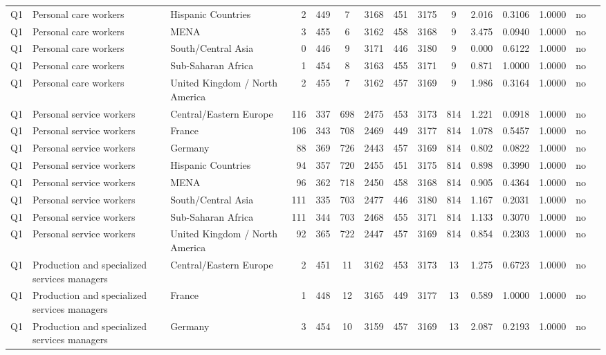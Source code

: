 \begin{longtable}{lllrcccccccccll}
Q1 & Personal care workers & Hispanic Countries & 2 & 449 & 7 & 3168 & 451 & 3175 & 9 & 2.016 & 0.3106 & 1.0000 & no \\
Q1 & Personal care workers & MENA & 3 & 455 & 6 & 3162 & 458 & 3168 & 9 & 3.475 & 0.0940 & 1.0000 & no \\
Q1 & Personal care workers & South/Central Asia & 0 & 446 & 9 & 3171 & 446 & 3180 & 9 & 0.000 & 0.6122 & 1.0000 & no \\
Q1 & Personal care workers & Sub-Saharan Africa & 1 & 454 & 8 & 3163 & 455 & 3171 & 9 & 0.871 & 1.0000 & 1.0000 & no \\
Q1 & Personal care workers & United Kingdom / North America & 2 & 455 & 7 & 3162 & 457 & 3169 & 9 & 1.986 & 0.3164 & 1.0000 & no \\
Q1 & Personal service workers & Central/Eastern Europe & 116 & 337 & 698 & 2475 & 453 & 3173 & 814 & 1.221 & 0.0918 & 1.0000 & no \\
Q1 & Personal service workers & France & 106 & 343 & 708 & 2469 & 449 & 3177 & 814 & 1.078 & 0.5457 & 1.0000 & no \\
Q1 & Personal service workers & Germany & 88 & 369 & 726 & 2443 & 457 & 3169 & 814 & 0.802 & 0.0822 & 1.0000 & no \\
Q1 & Personal service workers & Hispanic Countries & 94 & 357 & 720 & 2455 & 451 & 3175 & 814 & 0.898 & 0.3990 & 1.0000 & no \\
Q1 & Personal service workers & MENA & 96 & 362 & 718 & 2450 & 458 & 3168 & 814 & 0.905 & 0.4364 & 1.0000 & no \\
Q1 & Personal service workers & South/Central Asia & 111 & 335 & 703 & 2477 & 446 & 3180 & 814 & 1.167 & 0.2031 & 1.0000 & no \\
Q1 & Personal service workers & Sub-Saharan Africa & 111 & 344 & 703 & 2468 & 455 & 3171 & 814 & 1.133 & 0.3070 & 1.0000 & no \\
Q1 & Personal service workers & United Kingdom / North America & 92 & 365 & 722 & 2447 & 457 & 3169 & 814 & 0.854 & 0.2303 & 1.0000 & no \\
Q1 & Production and specialized services managers & Central/Eastern Europe & 2 & 451 & 11 & 3162 & 453 & 3173 & 13 & 1.275 & 0.6723 & 1.0000 & no \\
Q1 & Production and specialized services managers & France & 1 & 448 & 12 & 3165 & 449 & 3177 & 13 & 0.589 & 1.0000 & 1.0000 & no \\
Q1 & Production and specialized services managers & Germany & 3 & 454 & 10 & 3159 & 457 & 3169 & 13 & 2.087 & 0.2193 & 1.0000 & no \\

\end{longtable}
